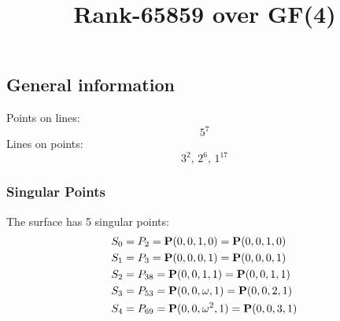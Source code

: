 \documentclass{article}
\newcommand\setTBstruts{\def\T{\rule{0pt}{2.6ex}}%
\def\B{\rule[-1.2ex]{0pt}{0pt}}}
\newcommand{\bP}{{\bf P}}
\begin{document}
 
\setTBstruts



{\allowdisplaybreaks%






\title{Rank-65859 over GF(4)}
\author{}%
\maketitle%
%
{}



\subsection*{General information}
Points on lines:
$$
5^7$$
Lines on points:
$$
3^2,\,2^6,\,1^{17}$$
\subsubsection*{Singular Points}
The surface has 5 singular points:\\
\begin{align*}
S_{0} &= P_{2}=\bP(0, 0, 1, 0) = \bP(0, 0, 1, 0)\\
S_{1} &= P_{3}=\bP(0, 0, 0, 1) = \bP(0, 0, 0, 1)\\
S_{2} &= P_{38}=\bP(0, 0, 1, 1) = \bP(0, 0, 1, 1)\\
S_{3} &= P_{53}=\bP(0, 0, \omega , 1) = \bP(0, 0, 2, 1)\\
S_{4} &= P_{69}=\bP(0, 0, \omega^{2}, 1) = \bP(0, 0, 3, 1)\\
\end{align*}
}
\end{document}

